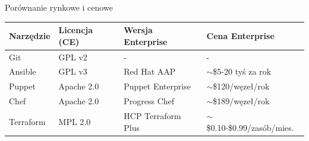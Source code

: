 \documentclass{beamer}
\begin{document}
\begin{frame}{Por\'ownanie rynkowe i cenowe}
    \begin{center}
        \footnotesize
        \setlength{\tabcolsep}{4pt}
        \begin{tabular}{@{}llll@{}}
            \toprule
            \textbf{Narz\k{e}dzie} & \textbf{Licencja (CE)} & \textbf{Wersja Enterprise} & \textbf{Cena Enterprise}        \\
            \midrule
            Git                    & GPL v2                 & -                          & -                               \\
            Ansible                & GPL v3                 & Red Hat AAP                & $\sim$\$5-20 tyś za rok         \\
            Puppet                 & Apache 2.0             & Puppet Enterprise          & $\sim$\$120/w\k{e}ze\l{}/rok    \\
            Chef                   & Apache 2.0             & Progress Chef              & $\sim$\$189/w\k{e}ze\l{}/rok    \\
            Terraform              & MPL 2.0                & HCP Terraform Plus         & $\sim$\$0.10-\$0.99/zasób/mies. \\
            \bottomrule
        \end{tabular}
    \end{center}
    \vspace{0.5em}
\end{frame}
\end{document}
